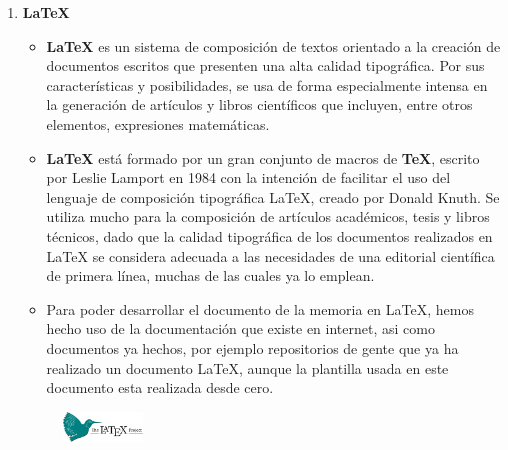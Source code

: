 \documentclass[a4paper]{article}
\begin{document}
\begin{enumerate}
\begin{itemize}
              \item Para desarrollar el documento, hemos tenido que descargarnos \textit{Perl}, \textit{LaTeX Workshop} y por ultimo \textit{MikTex}, esto es necesario si queremos que Visual Studio nos deje desarrollar cualquier docuemnto \LaTeX, además de un plugin para poder visualizar el documento pdf compilado desde Visual Studio.
          \end{itemize}
          \begin{figure}[!ht]
            \centering
            \texttt{[image: Images/t\_visual-studio-code4470.jpg]} 
            \caption{Logo de Visual studio code}
            \label{fig:visualstudio}
        \end{figure}
    \item \textbf{\LaTeX}
          \begin{itemize}
              \item \textbf{\LaTeX} es un sistema de composición de textos orientado a la creación de documentos escritos que presenten una alta calidad tipográfica. Por sus características y posibilidades, se usa de forma especialmente intensa en la generación de artículos y libros científicos que incluyen, entre otros elementos, expresiones matemáticas.
              \item \textbf{\LaTeX} está formado por un gran conjunto de macros de \textbf{TeX}, escrito por Leslie Lamport en 1984 con la intención de facilitar el uso del lenguaje de composición tipográfica \LaTeX, creado por Donald Knuth. Se utiliza mucho para la composición de artículos académicos, tesis y libros técnicos, dado que la calidad tipográfica de los documentos realizados en LaTeX se considera adecuada a las necesidades de una editorial científica de primera línea, muchas de las cuales ya lo emplean.
              \item Para poder desarrollar el documento de la memoria en \LaTeX, hemos hecho uso de la documentación que existe en internet, asi como documentos ya hechos, por ejemplo repositorios de gente que ya ha realizado un documento \LaTeX, aunque la plantilla usada en este documento esta realizada desde cero.
          \end{itemize}
          \begin{figure}[!ht]
            \centering
            \includegraphics[width=0.2\textwidth]{Images/LaTeX_project_logo_bird.svg.png} 

\end{figure}
\end{enumerate}
\end{document}
